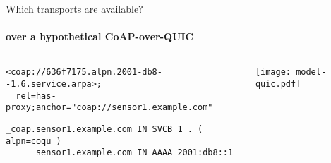 
\begin{frame}[fragile]{Which transports are available?}
    \framesubtitle{over a hypothetical CoAP-over-QUIC}
    \begin{columns}
        \begin{column}{0.7\textwidth}
\begin{verbatim}
<coap://636f7175.alpn.2001-db8--1.6.service.arpa>;
  rel=has-proxy;anchor="coap://sensor1.example.com"
\end{verbatim}
           
            \vspace{1cm}

\begin{verbatim}
_coap.sensor1.example.com IN SVCB 1 . ( alpn=coqu )
      sensor1.example.com IN AAAA 2001:db8::1
\end{verbatim}
        \end{column}
        \begin{column}{0.3\textwidth}
            \texttt{[image: model-quic.pdf]}
        \end{column}
    \end{columns}
\end{frame}


%
% 
% 

